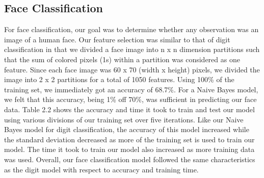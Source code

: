 \documentclass[10pt,parskip=half,
toc=sectionentrywithdots,
bibliography=totocnumbered,
captions=tableheading,numbers=noendperiod]{scrartcl}
\begin{document}
\hypertarget{face-classification}{%
\subsection{Face Classification}\label{face-classification}}

For face classification, our goal was to determine whether any
observation was an image of a human face. Our feature selection was
similar to that of digit classification in that we divided a face image
into n x n dimension partitions such that the sum of colored pixels (1s)
within a partition was considered as one feature. Since each face image
was 60 x 70 (width x height) pixels, we divided the image into 2 x 2
partitions for a total of 1050 features. Using 100\% of the training
set, we immediately got an accuracy of 68.7\%. For a Naive Bayes model,
we felt that this accuracy, being 1\% off 70\%, was sufficient in
predicting our face data. Table 2.2 shows the accuracy and time it took
to train and test our model using various divisions of our training set
over five iterations. Like our Naive Bayes model for digit
classification, the accuracy of this model increased while the standard
deviation decreased as more of the training set is used to train our
model. The time it took to train our model also increased as more
training data was used. Overall, our face classification model followed
the same characteristics as the digit model with respect to accuracy and
training time.
\end{document}

